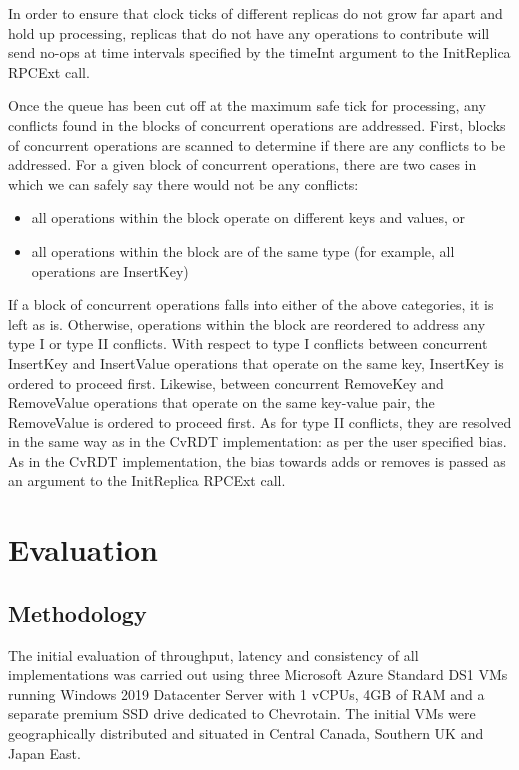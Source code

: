 \documentclass[sigconf,nonacm,10pt]{acmart}
\begin{document}
In order to ensure that clock ticks of different replicas do not grow far apart and hold up processing, replicas that do not have any operations to contribute will send no-ops at time intervals specified by the timeInt argument to the InitReplica RPCExt call.

Once the queue has been cut off at the maximum safe tick for processing, any conflicts found in the blocks of concurrent operations are addressed. First, blocks of concurrent operations are scanned to determine if there are any conflicts to be addressed. For a given block of concurrent operations, there are two cases in which we can safely say there would not be any conflicts:
\begin{itemize}
 \item all operations within the block operate on different keys and values, or
 \item all operations within the block are of the same type (for example, all operations are InsertKey)
\end{itemize}

If a block of concurrent operations falls into either of the above categories, it is left as is. Otherwise, operations within the block are reordered to address any type I or type II conflicts. With respect to type I conflicts between concurrent InsertKey and InsertValue operations that operate on the same key, InsertKey is ordered to proceed first. Likewise, between concurrent RemoveKey and RemoveValue operations that operate on the same key-value pair, the RemoveValue is ordered to proceed first. As for type II conflicts, they are resolved in the same way as in the CvRDT implementation: as per the user specified bias. As in the CvRDT implementation, the bias towards adds or removes is passed as an argument to the InitReplica RPCExt call.

\section{Evaluation}
\subsection{Methodology}
The initial evaluation of throughput, latency and consistency of all implementations was carried out using three Microsoft Azure Standard DS1 VMs running Windows 2019 Datacenter Server with 1 vCPUs, 4GB of RAM and a separate premium SSD drive dedicated to Chevrotain. The initial VMs were geographically distributed and situated in Central Canada, Southern UK and Japan East.
\end{document}
